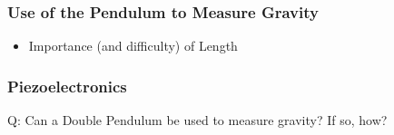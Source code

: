 \documentclass{beamer}
\begin{document}
\begin{frame}
\frametitle{Use of the Pendulum to Measure Gravity}
\begin{itemize}
\item Importance (and difficulty) of Length
\end{itemize}
\end{frame}

\begin{frame}
\frametitle{Piezoelectronics}
\end{frame}

\begin{frame}
\begin{exampleblock}{}
\begin{center}
\vskip 20pt
\Huge
Q: Can a Double Pendulum be used to measure gravity?
\vskip 12pt
If so, how?
\vskip 6pt
\ 
\end{center}
\end{exampleblock}
\end{frame}
\end{document}
